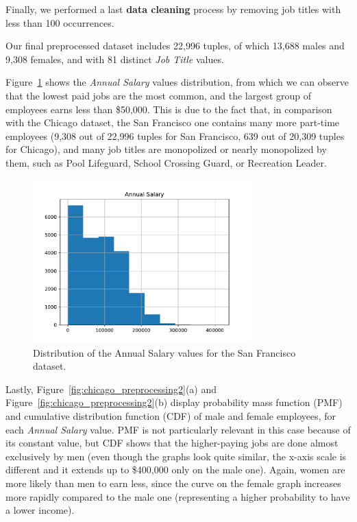 Finally, we performed a last \textbf{data cleaning} process by removing job titles with less than 100 occurrences.

Our final preprocessed dataset includes 22,996 tuples, of which 13,688 males and 9,308 females, and with 81 distinct \textit{Job Title} values.

Figure~\ref{fig:san_francisco_preprocessing1} shows the \textit{Annual Salary} values distribution, from which we can observe that the lowest paid jobs are the most common, and the largest group of employees earns less than \$50,000. This is due to the fact that, in comparison with the Chicago dataset, the San Francisco one contains many more part-time employees (9,308 out of 22,996 tuples for San Francisco, 639 out of 20,309 tuples for Chicago), and many job titles are monopolized or nearly monopolized by them, such as Pool Lifeguard, School Crossing Guard, or Recreation Leader.

\begin{figure}[t!]
\centering
\includegraphics[width=0.75\textwidth]{figures/san_francisco_annual_salary_distribution.pdf}
\caption{Distribution of the \textrm{Annual Salary} values for the San Francisco dataset.}
\label{fig:san_francisco_preprocessing1}
\end{figure}

Lastly, Figure~\ref{fig:chicago_preprocessing2}(a) and Figure~\ref{fig:chicago_preprocessing2}(b) display probability mass function (PMF) and cumulative distribution function (CDF) of male and female employees, for each \textit{Annual Salary} value. PMF is not particularly relevant in this case because of its constant value, but CDF shows that the higher-paying jobs are done almost exclusively by men (even though the graphs look quite similar, the x-axis scale is different and it extends up to \$400,000 only on the male one). Again, women are more likely than men to earn less, since the curve on the female graph increases more rapidly compared to the male one (representing a higher probability to have a lower income).

